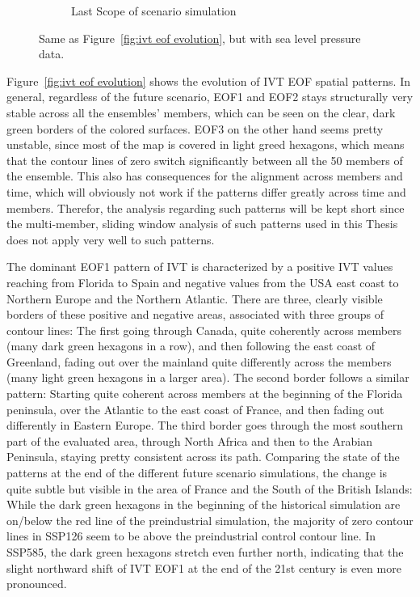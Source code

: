 \begin{figure}[!tbp]
\begin{subfigure}[b]{0.49\textwidth}
    \caption{Last Scope of scenario simulation}
    \label{fig:psl spatial patterns endscenario}
  \end{subfigure}
  \caption{Same as Figure~\ref{fig:ivt eof evolution}, but with sea level pressure data.}\label{fig:psl eof evolution}
\end{figure}


Figure~\ref{fig:ivt eof evolution} shows the evolution of IVT EOF spatial patterns. 
In general, regardless of the future scenario, EOF1 and EOF2 stays structurally very stable across all the ensembles' members, which can be seen on the clear, dark green borders of the colored surfaces. 
EOF3 on the other hand seems pretty unstable, since most of the map is covered in light greed hexagons, which means that the contour lines of zero switch significantly between all the 50 members of the ensemble. 
This also has consequences for the alignment across members and time, which will obviously not work if the patterns differ greatly across time and members. 
Therefor, the analysis regarding such patterns will be kept short since the multi-member, sliding window analysis of such patterns used in this Thesis does not apply very well to such patterns. 

The dominant EOF1 pattern of IVT is characterized by a positive IVT values reaching from Florida to Spain and negative values from the USA east coast to Northern Europe and the Northern Atlantic. 
There are three, clearly visible borders of these positive and negative areas, associated with three groups of contour lines: The first going through Canada, quite coherently across members (many dark green hexagons in a row), and then following the east coast of Greenland, fading out over the mainland quite differently across the members (many light green hexagons in a larger area). 
The second border follows a similar pattern: Starting quite coherent across members at the beginning of the Florida peninsula, over the Atlantic to the east coast of France, and then fading out differently in Eastern Europe. 
The third border goes through the most southern part of the evaluated area, through North Africa and then to the Arabian Peninsula, staying pretty consistent across its path. 
Comparing the state of the patterns at the end of the different future scenario simulations, the change is quite subtle but visible in the area of France and the South of the British Islands:
While the dark green hexagons in the beginning of the historical simulation are on/below the red line of the preindustrial simulation, the majority of zero contour lines in SSP126 seem to be above the preindustrial control contour line. 
In SSP585, the dark green hexagons stretch even further north, indicating that the slight northward shift of IVT EOF1 at the end of the 21st century is even more pronounced. 

